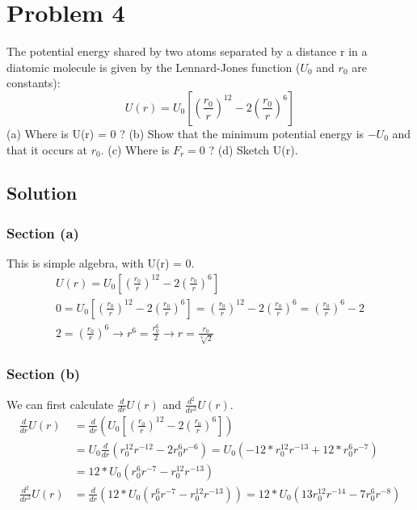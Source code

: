 \documentclass[12pt]{article}
\begin{document}
\pagebreak
\section*{Problem 4}
The potential energy shared by two atoms separated by a distance r in a diatomic molecule is given by the
Lennard-Jones function ($U_0$ and $r_0$ are constants):
\[ U(r) = U_0\left[ \left(\frac{r_0}{r}\right)^{12} - 2\left(\frac{r_0}{r}\right)^{6} \right] \]
(a) Where is U(r) = 0 ? (b) Show that the minimum potential energy is $-U_0$ and that it occurs at $r_0$. (c)
Where is $F_r = 0$ ? (d) Sketch U(r).

\subsection*{Solution}
\subsubsection*{Section (a)}
This is simple algebra, with U(r) = 0.
\begin{gather*}
    U(r) = U_0\left[ \left(\frac{r_0}{r}\right)^{12} - 2\left(\frac{r_0}{r}\right)^{6} \right]\\
    0   =   U_0\left[ \left(\frac{r_0}{r}\right)^{12} - 2\left(\frac{r_0}{r}\right)^{6} \right]
        =   \left(\frac{r_0}{r}\right)^{12} - 2\left(\frac{r_0}{r}\right)^{6}
        =   \left(\frac{r_0}{r}\right)^{6} - 2\\
    2   =   \left(\frac{r_0}{r}\right)^{6}\rightarrow
    r^6 =   \frac{r_0^6}{2}\rightarrow
    \boxed{ r   =   \frac{r_0}{\sqrt[6]{2}} }
\end{gather*}

\subsubsection*{Section (b)}
We can first calculate $ \frac{d}{dr}U(r) $ and $ \frac{d^2}{dr^2}U(r) $.
\begin{align*}
    \frac{d}{dr}U(r) &= \frac{d}{dr} \left( U_0\left[ \left(\frac{r_0}{r}\right)^{12} - 2\left(\frac{r_0}{r}\right)^{6} \right] \right)\\
        &=  U_0 \frac{d}{dr} \left( r_0^{12} r^{-12} - 2r_0^{6}r^{-6} \right)
        =  U_0 \left( -12*r_0^{12} r^{-13} + 12*r_0^{6}r^{-7} \right)\\
        &=   12 * U_0 \left( r_0^{6}r^{-7} - r_0^{12} r^{-13} \right)\\
    \frac{d^2}{dr^2}U(r)    &=  \frac{d}{dr}\left(12 * U_0 \left( r_0^{6}r^{-7} - r_0^{12} r^{-13} \right)\right)
        =   12 * U_0 \left( 13r_0^{12} r^{-14} - 7r_0^{6}r^{-8} \right)
\end{align*}
\end{document}
